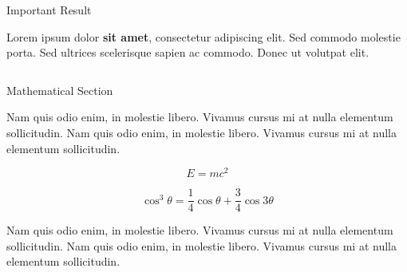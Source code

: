\documentclass{article}
\begin{document}
\begin{frame}
\begin{columns}[t]
\begin{column}{\twocolwid}
\begin{columns}[t,totalwidth=\twocolwid]
\begin{column}{\onecolwid}
\end{column} %

\end{columns} %


\begin{alertblock}{Important Result}

Lorem ipsum dolor \textbf{sit amet}, consectetur adipiscing elit. Sed commodo molestie porta. Sed ultrices scelerisque sapien ac commodo. Donec ut volutpat elit.

\end{alertblock} 


\begin{columns}[t,totalwidth=\twocolwid] %

\begin{column}{\onecolwid} %


\begin{exampleblock}{Mathematical Section}

Nam quis odio enim, in molestie libero. Vivamus cursus mi at nulla elementum sollicitudin. Nam quis odio enim, in molestie libero. Vivamus cursus mi at nulla elementum sollicitudin.
  
\begin{equation}
E = mc^{2}
\label{eqn:Einstein}
\end{equation}

\begin{equation}
\cos^3 \theta =\frac{1}{4}\cos\theta+\frac{3}{4}\cos 3\theta
\label{eqn:cosfunc}
\end{equation}

Nam quis odio enim, in molestie libero. Vivamus cursus mi at nulla elementum sollicitudin. Nam quis odio enim, in molestie libero. Vivamus cursus mi at nulla elementum sollicitudin.


\end{exampleblock}
\end{column}
\end{columns}
\end{column}
\end{columns}
\end{frame}
\end{document}
